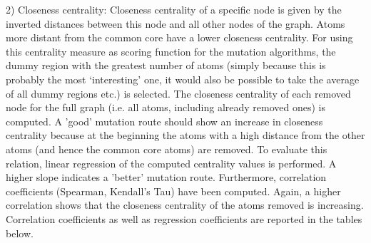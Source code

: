 2) Closeness centrality: Closeness centrality of a specific node is
given by the inverted distances between this node and all other nodes
of the graph\cite{Newman.2010}. Atoms more distant from the common core have a lower
closeness centrality.
For using this centrality measure as scoring function for the mutation
algorithms, the dummy region with the greatest number of atoms (simply
because this is probably the most \textquoteleft interesting\textquoteright{}
one, it would also be possible to take the average of all dummy regions
etc.) is selected. The closeness centrality of each removed node for
the full graph (i.e. all atoms, including already removed ones) is
computed. A 'good' mutation route should show an increase in closeness
centrality because at the beginning the atoms with a high distance
from the other atoms (and hence the common core atoms) are removed.
To evaluate this relation, linear regression of the computed centrality
values is performed. A higher slope indicates a 'better' mutation
route. Furthermore, correlation coefficients (Spearman, Kendall's
Tau) have been computed. Again, a higher correlation shows that the
closeness centrality of the atoms removed is increasing. Correlation
coefficients as well as regression coefficients are reported in the
tables below.


